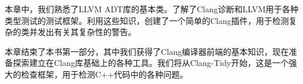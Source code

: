 本章中，我们熟悉了LLVM ADT库的基本类。了解了Clang诊断和LLVM用于各种类型测试的测试框架。利用这些知识，创建了一个简单的Clang插件，用于检测复杂的类并发出有关其复杂性的警告。

本章结束了本书第一部分，其中我们获得了Clang编译器前端的基本知识，现在准备探索建立在Clang库基础上的各种工具。我们将从Clang-Tidy开始，这是一个强大的检查框架，用于检测C++代码中的各种问题。